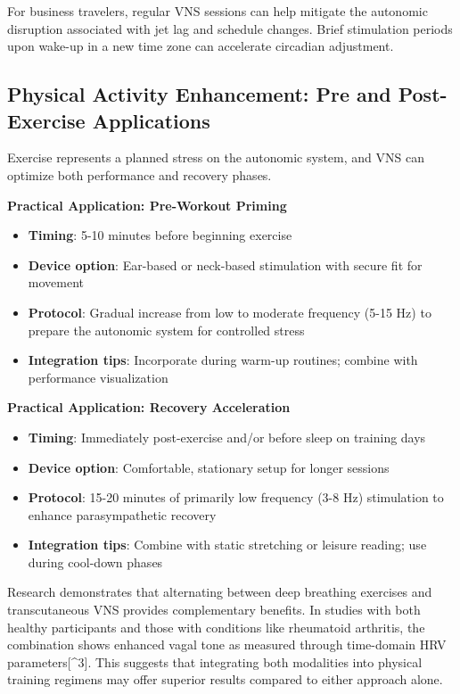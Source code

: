 \documentclass[
  Letterpaper,
]{scrbook}
\providecommand{\tightlist}{%
  \setlength{\itemsep}{0pt}\setlength{\parskip}{0pt}}\usepackage{longtable,booktabs,array}
\begin{document}
For business travelers, regular VNS sessions can help mitigate the
autonomic disruption associated with jet lag and schedule changes. Brief
stimulation periods upon wake-up in a new time zone can accelerate
circadian adjustment.

\subsection{Physical Activity Enhancement: Pre and Post-Exercise
Applications}\label{physical-activity-enhancement-pre-and-post-exercise-applications}

Exercise represents a planned stress on the autonomic system, and VNS
can optimize both performance and recovery phases.

\textbf{Practical Application: Pre-Workout Priming}

\begin{itemize}
\tightlist
\item
  \textbf{Timing}: 5-10 minutes before beginning exercise
\item
  \textbf{Device option}: Ear-based or neck-based stimulation with
  secure fit for movement
\item
  \textbf{Protocol}: Gradual increase from low to moderate frequency
  (5-15 Hz) to prepare the autonomic system for controlled stress
\item
  \textbf{Integration tips}: Incorporate during warm-up routines;
  combine with performance visualization
\end{itemize}

\textbf{Practical Application: Recovery Acceleration}

\begin{itemize}
\tightlist
\item
  \textbf{Timing}: Immediately post-exercise and/or before sleep on
  training days
\item
  \textbf{Device option}: Comfortable, stationary setup for longer
  sessions
\item
  \textbf{Protocol}: 15-20 minutes of primarily low frequency (3-8 Hz)
  stimulation to enhance parasympathetic recovery
\item
  \textbf{Integration tips}: Combine with static stretching or leisure
  reading; use during cool-down phases
\end{itemize}

Research demonstrates that alternating between deep breathing exercises
and transcutaneous VNS provides complementary benefits. In studies with
both healthy participants and those with conditions like rheumatoid
arthritis, the combination shows enhanced vagal tone as measured through
time-domain HRV parameters{[}\^{}3{]}. This suggests that integrating
both modalities into physical training regimens may offer superior
results compared to either approach alone.
\end{document}
